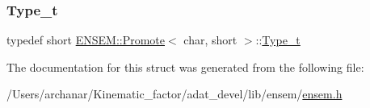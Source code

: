 \subsubsection{\texorpdfstring{Type\_t}{Type\_t}\hspace{0.1cm}{\footnotesize\ttfamily [2/2]}}
{\footnotesize\ttfamily typedef short \mbox{\hyperlink{structENSEM_1_1Promote}{E\+N\+S\+E\+M\+::\+Promote}}$<$ char, short $>$\+::\mbox{\hyperlink{structENSEM_1_1Promote_3_01char_00_01short_01_4_a4f4c8da33427bfc6c1ff6d15e8639105}{Type\+\_\+t}}}



The documentation for this struct was generated from the following file\+:\begin{DoxyCompactItemize}
\item 
/\+Users/archanar/\+Kinematic\+\_\+factor/adat\+\_\+devel/lib/ensem/\mbox{\hyperlink{lib_2ensem_2ensem_8h}{ensem.\+h}}\end{DoxyCompactItemize}
